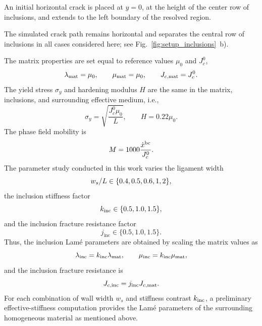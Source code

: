 \documentclass[pamm,a4paper,fleqn]{w-art}
\newcommand{\Kinc}{k_{\rm inc}}
\newcommand{\Jinc}{j_{\text{inc}}}
\begin{document}
An initial horizontal crack is placed at \(y=0\), at the height of
the center row of inclusions, and extends to the left boundary of the
resolved region.

The simulated crack path remains horizontal and separates the central
row of inclusions in all cases considered here; see
Fig.~\ref{fig:setup_inclusions}~b).


The matrix properties are set equal to reference values \(\mu_0\) and
\(J_c^0\),
\begin{equation}
  \lambda_{\rm mat}=\mu_0,\qquad
  \mu_{\rm mat}=\mu_0,\qquad
  J_{c,\rm mat}=J_c^0.
\end{equation}
The yield stress \(\sigma_y\) and hardening modulus \(H\) are the same
in the matrix, inclusions, and surrounding effective medium, i.e.,
\begin{equation}
    \sigma_y=\sqrt{\frac{J_c^0\mu_0}{L}},\qquad
  H=0.22\mu_0.
\end{equation}
The phase field mobility is
\begin{equation}
  M=1000\frac{\dot{x}^{\rm bc}}{J_c^0}.
\end{equation}
The parameter study conducted in this work varies the ligament width
\begin{equation}
  w_s/L \in \{0.4, 0.5, 0.6, 1, 2\},
\end{equation}
the inclusion stiffness factor
\begin{equation}
  \Kinc \in \{0.5,1.0,1.5\},
\end{equation}
and the inclusion fracture resistance factor
\begin{equation}
  \Jinc \in \{0.5,1.0,1.5\}.
\end{equation}
Thus, the inclusion Lam\'e parameters are obtained by scaling the
matrix values as
\begin{equation}
  \lambda_{\rm inc}=\Kinc\lambda_{\rm mat}, \qquad
  \mu_{\rm inc}=\Kinc\mu_{\rm mat},
\end{equation}
and the inclusion fracture resistance is
\begin{equation}
  J_{c,\rm inc}=\Jinc J_{c,\rm mat}.
\end{equation}
For each combination of wall width \(w_s\) and stiffness contrast
\(\Kinc\), a preliminary
effective-stiffness computation provides the Lam\'e parameters of the
surrounding homogeneous material as mentioned above.
\end{document}
